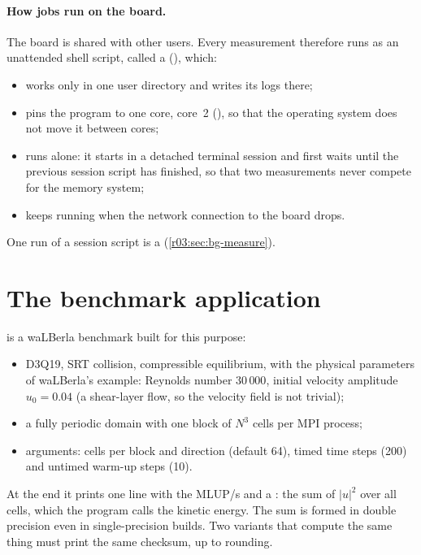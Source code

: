 \paragraph{How jobs run on the board.} The board is shared with other users. Every
measurement therefore runs as an unattended shell script, called a 
(), which:
\begin{itemize}
  \item works only in one user directory and writes its logs there;
  \item pins the program to one core, core~2 (), so that the operating
        system does not move it between cores;
  \item runs alone: it starts in a detached  terminal session and first waits
        until the previous session script has finished, so that two measurements never
        compete for the memory system;
  \item keeps running when the network connection to the board drops.
\end{itemize}
One run of a session script is a  (\cref{r03:sec:bg-measure}).

\section{The benchmark application}\label{r03:sec:app}

 is a waLBerla benchmark built for
this purpose:
\begin{itemize}
  \item D3Q19, SRT collision, compressible equilibrium, with the physical parameters of
        waLBerla's  example: Reynolds number $30\,000$, initial
        velocity amplitude $u_0 = 0.04$ (a shear-layer flow, so the velocity field is not
        trivial);
  \item a fully periodic domain with one block of $N^3$ cells per MPI process;
  \item arguments: cells per block and direction (default 64), timed time steps (200) and
        untimed warm-up steps (10).
\end{itemize}
At the end it prints one line with the MLUP/s and a : the sum of $|u|^2$ over
all cells, which the program calls the kinetic energy. The sum is formed in double precision
even in single-precision builds. Two variants that compute the same thing must print the
same checksum, up to rounding.

